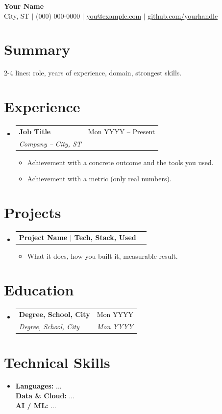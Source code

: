 \documentclass[letterpaper,10pt]{article}
\makeatletter
\newcommand{\resumeItem}[1]{\item\small{#1 \vspace{-2pt}}}
\newcommand{\resumeSubheading}[4]{
  \vspace{1pt}\item
    \begin{tabular*}{\textwidth}[t]{l@{\extracolsep{\fill}}r}
      \textbf{#1} & \small #2 \\
      \textit{\small#3} & \textit{\small #4} \\
    \end{tabular*}\vspace{-5pt}
}
\newcommand{\resumeProjectHeading}[2]{
  \vspace{1pt}\item
    \begin{tabular*}{\textwidth}{l@{\extracolsep{\fill}}r}
      \small\textbf{#1} & \small #2 \\
    \end{tabular*}\vspace{-5pt}
}
\newcommand{\resumeSubHeadingListStart}{\begin{itemize}[leftmargin=0in, label={}]}
\newcommand{\resumeSubHeadingListEnd}{\end{itemize}\vspace{-3pt}}
\newcommand{\resumeItemListStart}{\begin{itemize}[leftmargin=0.15in, label={$\bullet$}]\setlength\itemsep{0pt}}
\newcommand{\resumeItemListEnd}{\end{itemize}\vspace{-4pt}}
\makeatother
\begin{document}
\begin{center}
  {\LARGE \textbf{Your Name}} \\[2pt]
  \small
  City, ST $|$ (000) 000-0000 $|$
  \href{mailto:you@example.com}{you@example.com} $|$
  \href{https://github.com/yourhandle}{github.com/yourhandle}
\end{center}
\vspace{-6pt}

\section{Summary}
\vspace{2pt}
\small{
2-4 lines: role, years of experience, domain, strongest skills.
}
\vspace{-2pt}

\section{Experience}
\resumeSubHeadingListStart
  \resumeSubheading
    {Job Title}{Mon YYYY -- Present}
    {Company -- City, ST}{}
  \resumeItemListStart
    \resumeItem{Achievement with a concrete outcome and the tools you used.}
    \resumeItem{Achievement with a metric (only real numbers).}
  \resumeItemListEnd
\resumeSubHeadingListEnd

\section{Projects}
\resumeSubHeadingListStart
  \resumeProjectHeading
    {Project Name $|$ \normalfont\small Tech, Stack, Used}{}
  \resumeItemListStart
    \resumeItem{What it does, how you built it, measurable result.}
  \resumeItemListEnd
\resumeSubHeadingListEnd

\section{Education}
\resumeSubHeadingListStart
  \resumeSubheading
    {\textnormal{Degree, School, City}}{\textnormal{Mon YYYY}}
    {\textnormal{Degree, School, City}}{\textnormal{Mon YYYY}}
\resumeSubHeadingListEnd

\section{Technical Skills}
\resumeSubHeadingListStart
  \item\small{
    \textbf{Languages:} ... \\[1pt]
    \textbf{Data \& Cloud:} ... \\[1pt]
    \textbf{AI / ML:} ...
  }
\resumeSubHeadingListEnd
\end{document}

